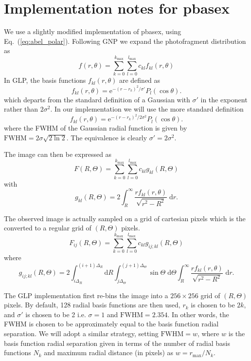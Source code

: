\documentclass{article}
\renewcommand{\eqref}[1]{Eq.~(\ref{#1})}
\renewcommand{\exp}[1]{\ensuremath{\mathrm{e}^{#1}}}
\begin{document}
\section{Implementation notes for pbasex}
We use a slightly modified implementation of pbasex, using
\eqref{eq:abel_polar}. Following GNP we expand the photofragment distribution
as
\begin{equation}
  f(r,\theta)=
  \sum_{k=0}^{k_\mathrm{max}}
  \sum_{l=0}^{l_\mathrm{max}}
  c_{kl}f_{kl}(r,\theta)
\end{equation}
In GLP, the basis functions $f_{kl}(r,\theta)$ are defined as
\begin{equation}
  f_{kl}(r,\theta)=
  \exp{-(r-r_k)^2/\sigma'}P_l(\cos\theta).
\end{equation}
which departs from the standard definition of a Gaussian with $\sigma'$ in the
exponent rather than $2\sigma^2$. In our implementation we will use the more
standard definition
\begin{equation}
  f_{kl}(r,\theta)=
  \exp{-(r-r_k)^2/2\sigma^2}P_l(\cos\theta).
\end{equation}
where the FWHM of the Gaussian radial function is given by
$\mathrm{FWHM}=2\sigma\sqrt{2\ln2}$. The equivalence is clearly
$\sigma'=2\sigma^2$.

The image can then be expressed as
\begin{equation}
  F(R, \Theta)=
  \sum_{k=0}^{k_\mathrm{max}}
  \sum_{l=0}^{l_\mathrm{max}}
  c_{kl}g_{kl}(R,\Theta)
\end{equation}
with
\begin{equation}
  g_{kl}(R,\Theta)=
  2\int_{R}^\infty
  \frac{rf_{kl}(r, \theta)}{\sqrt{r^2-R^2}}\;\mathrm{d}r.
\end{equation}

The observed image is actually sampled on a grid of cartesian pixels which is
the converted to a regular grid of $(R, \Theta)$ pixels.
\begin{equation}
  F_{ij}(R, \Theta)=
  \sum_{k=0}^{k_\mathrm{max}}
  \sum_{l=0}^{l_\mathrm{max}}
  c_{kl}g_{ij;kl}(R,\Theta)
\end{equation}
where
\begin{equation}
  g_{ij;kl}(R,\Theta)=
  2
  \int_{i\Delta_R}^{(i+1)\Delta_R}\mathrm{d}R
  \int_{j\Delta_\Theta}^{(j+1)\Delta_\Theta}\sin\Theta\;\mathrm{d}\Theta
  \int_{R}^\infty
  \frac{rf_{kl}(r, \theta)}{\sqrt{r^2-R^2}}\;\mathrm{d}r.
\end{equation}

The GLP implementation first re-bins the image into a $256\times256$ grid of
$(R, \Theta)$ pixels. By default, 128 radial basis functions are then used,
$r_k$ is chosen to be $2k$, and $\sigma'$ is chosen to be 2 i.e. $\sigma=1$
and $\mathrm{FWHM}=2.354$. In other words, the FWHM is chosen to be
approximately equal to the basis function radial separation. We will adopt a
similar strategy, setting $\mathrm{FWHM}=w$, where $w$ is the basis function
radial separation given in terms of the number of radial basis functions $N_k$
and maximum radial distance (in pixels) as $w=r_\mathrm{max}/N_k$.
\end{document}
